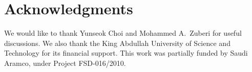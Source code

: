 \section{Acknowledgments}
We would like to thank Yunseok Choi and Mohammed A.~Zuberi for useful discussions. We also thank the King Abdullah University of Science and Technology for its financial support. This work was partially funded by Saudi Aramco, under Project FSD-016/2010.












   


